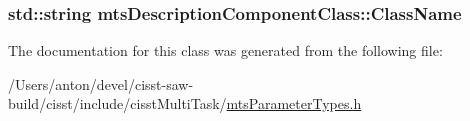 \subsubsection[{Class\+Name}]{\setlength{\rightskip}{0pt plus 5cm}std\+::string mts\+Description\+Component\+Class\+::\+Class\+Name}\label{classmts_description_component_class_a21979fdd472f25ebc71fe20e9389f41f}


The documentation for this class was generated from the following file\+:\begin{DoxyCompactItemize}
\item 
/\+Users/anton/devel/cisst-\/saw-\/build/cisst/include/cisst\+Multi\+Task/\hyperlink{mts_parameter_types_8h}{mts\+Parameter\+Types.\+h}\end{DoxyCompactItemize}
